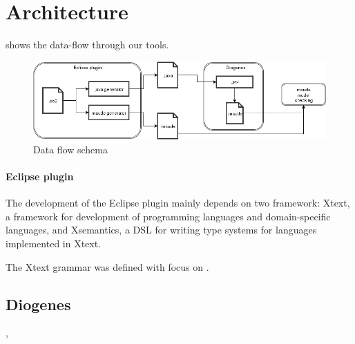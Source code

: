\section{Architecture}

 shows the data-flow through our tools.

\begin{figure}
    \includegraphics[width=\textwidth]{img/diogenes-arch.png}
    \caption{Data flow schema}
    \label{fig:data-flow}
\end{figure}

\paragraph{Eclipse plugin}
The development of the Eclipse plugin mainly depends on
two framework: Xtext\cite{xtext-site}, a framework for 
development of programming languages and domain-specific languages, and
Xsemantics\cite{xsemantics-site}, a DSL for writing type systems
for languages implemented in Xtext.

The Xtext grammar was defined with focus on \cite{verifiable}.


\subsection{Diogenes}
\cite{visser2003model}, \cite{lerda2001addressing}





